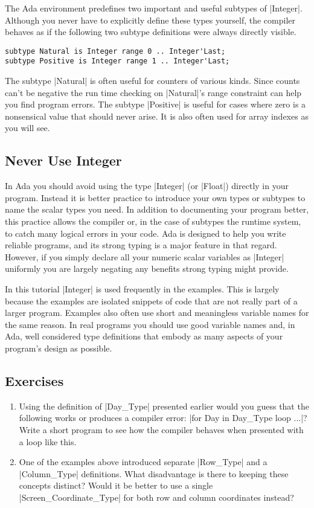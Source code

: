 The Ada environment predefines two important and useful subtypes of |Integer|. Although you
never have to explicitly define these types yourself, the compiler behaves as if the following
two subtype definitions were always directly visible.

\begin{lstlisting}
subtype Natural is Integer range 0 .. Integer'Last;
subtype Positive is Integer range 1 .. Integer'Last;
\end{lstlisting}

\noindent The subtype |Natural| is often useful for counters of various kinds. Since counts
can't be negative the run time checking on |Natural|'s range constraint can help you find
program errors. The subtype |Positive| is useful for cases where zero is a nonsensical value
that should never arise. It is also often used for array indexes as you will see.

\subsection{Never Use Integer}

In Ada you should avoid using the type |Integer| (or |Float|) directly in your program. Instead
it is better practice to introduce your own types or subtypes to name the scalar types you need.
In addition to documenting your program better, this practice allows the compiler or, in the
case of subtypes the runtime system, to catch many logical errors in your code. Ada is designed
to help you write reliable programs, and its strong typing is a major feature in that regard.
However, if you simply declare all your numeric scalar variables as |Integer| uniformly you are
largely negating any benefits strong typing might provide.

In this tutorial |Integer| is used frequently in the examples. This is largely because the
examples are isolated snippets of code that are not really part of a larger program. Examples
also often use short and meaningless variable names for the same reason. In real programs you
should use good variable names and, in Ada, well considered type definitions that embody as many
aspects of your program's design as possible.

\subsection*{Exercises}

\begin{enumerate}
\item Using the definition of |Day_Type| presented earlier would you guess that the following
  works or produces a compiler error: |for Day in Day_Type loop ...|? Write a short program to
  see how the compiler behaves when presented with a loop like this.

\item One of the examples above introduced separate |Row_Type| and a |Column_Type| definitions.
  What disadvantage is there to keeping these concepts distinct? Would it be better to use a
  single |Screen_Coordinate_Type| for both row and column coordinates instead?
\end{enumerate}

